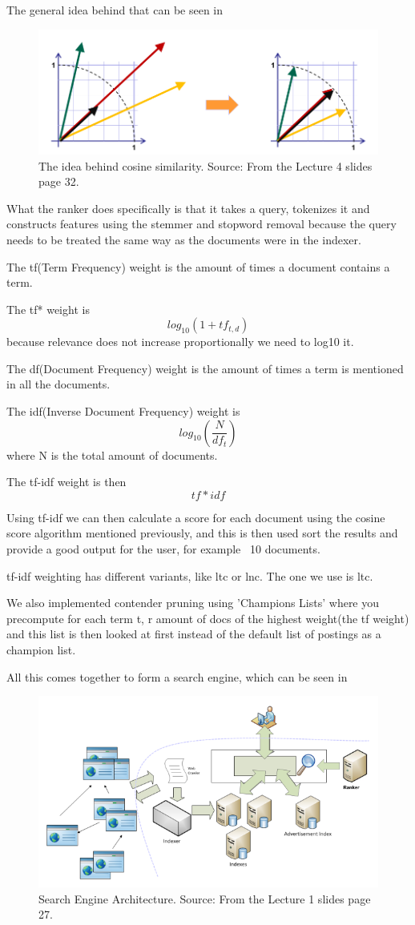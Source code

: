 	The general idea behind that can be seen in 
	
	\begin{figure}[H]
	\centering
	\includegraphics[width=0.7\linewidth]{Media/CosineSimilarity}
	\caption{The idea behind cosine similarity. Source: From the Lecture 4 slides page 32.}
	\label{fig:CosineSimilarity}
	\end{figure}
	
	What the ranker does specifically is that it takes a query, tokenizes it and constructs features using the stemmer and stopword removal because the query needs to be treated the same way as the documents were in the indexer.
	
	The tf(Term Frequency) weight is the amount of times a document contains a term.
	
	The tf* weight is $$log_{10}(1+tf_{t,d})$$ because relevance does not increase proportionally we need to log10 it.
	
	The df(Document Frequency) weight is the amount of times a term is mentioned in all the documents.
	
	The idf(Inverse Document Frequency) weight is $$log_{10}(\frac{N}{df_{t}})$$ where N is the total amount of documents.
	
	The tf-idf weight is then $$tf*idf$$
	
	Using tf-idf we can then calculate a score for each document using the cosine score algorithm mentioned previously, and this is then used sort the results and provide a good output for the user, for example ~10 documents.
	
	tf-idf weighting has different variants, like ltc or lnc. The one we use is ltc.
	
	We also implemented contender pruning using 'Champions Lists' where you precompute for each term t, r amount of docs of the highest weight(the tf weight) and this list is then looked at first instead of the default list of postings as a champion list.
	
	All this comes together to form a search engine, which can be seen in 
	
	\begin{figure}[H]
	\centering
	\includegraphics[width=0.7\linewidth]{Media/searchenginearchitecture}
	\caption{Search Engine Architecture. Source: From the Lecture 1 slides page 27.}
	\label{fig:searchenginearchitecture}
	\end{figure}
	


